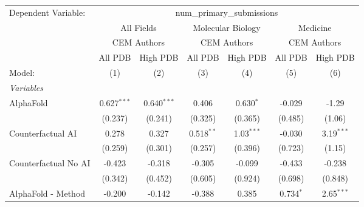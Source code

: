 \begingroup
\centering
\begin{tabular}{lcccccc}
   \tabularnewline \midrule \midrule
   Dependent Variable: & \multicolumn{6}{c}{num\_primary\_submissions}\\
 & \multicolumn{2}{c}{All Fields} & \multicolumn{2}{c}{Molecular Biology} & \multicolumn{2}{c}{Medicine} \\
\cmidrule(lr){2-3} \cmidrule(lr){4-5} \cmidrule(lr){6-7}
 & \multicolumn{2}{c}{CEM Authors} & \multicolumn{2}{c}{CEM Authors} & \multicolumn{2}{c}{CEM Authors} \\
\cmidrule(lr){2-3} \cmidrule(lr){4-5} \cmidrule(lr){6-7}
 & \multicolumn{1}{c}{All PDB} & \multicolumn{1}{c}{High PDB} & \multicolumn{1}{c}{All PDB} & \multicolumn{1}{c}{High PDB} & \multicolumn{1}{c}{All PDB} & \multicolumn{1}{c}{High PDB} \\
\cmidrule(lr){2-2} \cmidrule(lr){3-3} \cmidrule(lr){4-4} \cmidrule(lr){5-5} \cmidrule(lr){6-6} \cmidrule(lr){7-7}
   Model:                                                     & (1)           & (2)           & (3)           & (4)           & (5)           & (6)\\  
   \midrule
   \emph{Variables}\\
   AlphaFold                                                  & 0.627$^{***}$ & 0.640$^{***}$ & 0.406         & 0.630$^{*}$   & -0.029        & -1.29\\   
                                                              & (0.237)       & (0.241)       & (0.325)       & (0.365)       & (0.485)       & (1.06)\\   
   Counterfactual AI                                          & 0.278         & 0.327         & 0.518$^{**}$  & 1.03$^{***}$  & -0.030        & 3.19$^{***}$\\   
                                                              & (0.259)       & (0.301)       & (0.257)       & (0.396)       & (0.723)       & (1.15)\\   
   Counterfactual No AI                                       & -0.423        & -0.318        & -0.305        & -0.099        & -0.433        & -0.238\\   
                                                              & (0.342)       & (0.452)       & (0.605)       & (0.924)       & (0.698)       & (0.848)\\   
   AlphaFold - Method                                         & -0.200        & -0.142        & -0.388        & 0.385         & 0.734$^{*}$   & 2.65$^{***}$\\   

\end{tabular}
